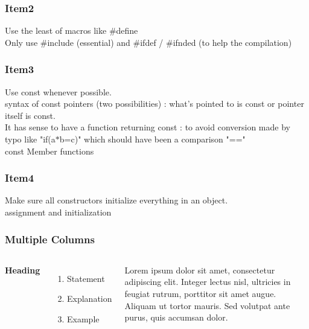 \documentclass{beamer}
\begin{document}
\begin{frame}
\frametitle{Item2}
Use the least of macros like \#define \\
Only use \#include (essential) and \#ifdef / \#ifnded (to help the compilation)
\end{frame}

\begin{frame}
\frametitle{Item3}
Use const whenever possible. \\
syntax of const pointers (two possibilities) : what's pointed to is const or pointer itself is const. \\

It has sense to have a function returning const : to avoid conversion made by typo like "if(a$\ast$b=c)" which should have been a comparison "==" \\

const Member functions

\end{frame}

\begin{frame}
\frametitle{Item4}
Make sure all constructors initialize everything in an object. \\

assignment and initialization

\end{frame}



\begin{frame}
\frametitle{Multiple Columns}
\begin{columns}[c] %

\textbf{Heading}
\begin{enumerate}
\item Statement
\item Explanation
\item Example
\end{enumerate}

Lorem ipsum dolor sit amet, consectetur adipiscing elit. Integer lectus nisl, ultricies in feugiat rutrum, porttitor sit amet augue. Aliquam ut tortor mauris. Sed volutpat ante purus, quis accumsan dolor.

\end{columns}
\end{frame}
\end{document}
